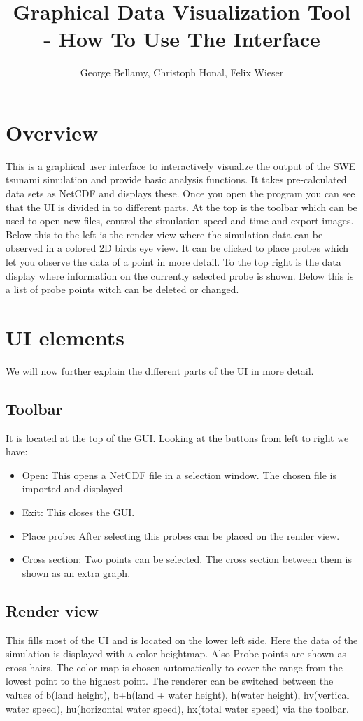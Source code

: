 \documentclass[paper=a4]{proc}
\title{Graphical Data Visualization Tool - How To Use The Interface}
\author{George Bellamy, Christoph Honal, Felix Wieser}
\begin{document}
	\maketitle
	\thispagestyle{plain}	%
	\section{Overview}
		This is a graphical user interface to interactively visualize the output of the SWE tsunami simulation and provide basic analysis functions. It takes pre-calculated data sets as NetCDF and displays these. 
Once you open the program you can see that the UI is divided in to different parts. At the top is the toolbar which can be used to open new files, control the simulation speed and time and export images. Below this to the left is the render view where the simulation data can be observed in a colored 2D birds eye view. It can be clicked to place probes which let you observe the data of a point in more detail.
To the top right is the data display where information on the currently selected probe is shown. Below this is a list of probe points witch can be deleted or changed.
		
	\section{UI elements}
	We will now further explain the different parts of the UI in more detail. 
	
		\subsection{Toolbar}
		It is located at the top of the GUI. Looking at the buttons from left to right we have:
		\begin{itemize}
		\item Open: This opens a NetCDF file in a selection window. The chosen file is imported and displayed
		\item Exit: This closes the GUI.
		\item Place probe: After selecting this probes can be placed on the render view.
		\item Cross section: Two points can be selected. The cross section between them is shown as an extra graph.
		\end{itemize}
		
			
		\subsection{Render view}
		This fills most of the UI and is located on the lower left side. Here the data of the simulation is displayed with a color heightmap. Also Probe points are shown as cross hairs. The color map is chosen automatically to cover the range from the lowest point to the highest point. The renderer can be switched between the values of b(land height), b+h(land + water height), h(water height), hv(vertical water speed), hu(horizontal water speed), hx(total water speed) via the toolbar.
\end{document}
